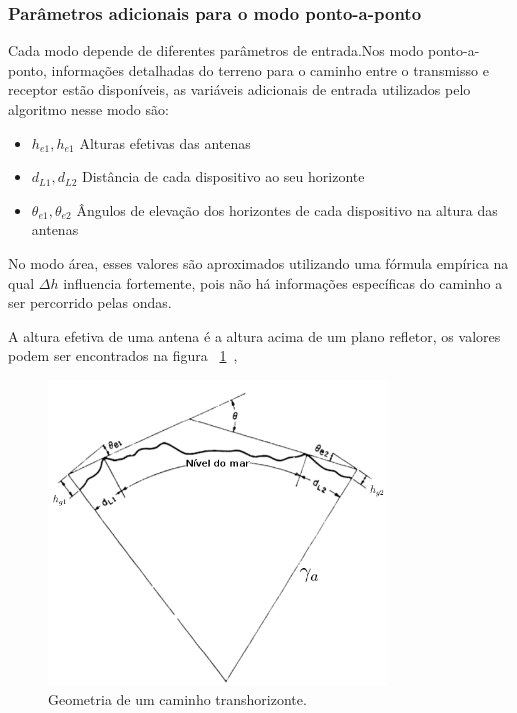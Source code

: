\subsubsection{Parâmetros adicionais para o modo ponto-a-ponto}

Cada modo depende de diferentes parâmetros de entrada.Nos modo ponto-a-ponto, informações detalhadas do terreno para o caminho entre o transmisso e receptor estão disponíveis, as variáveis adicionais de entrada utilizados pelo algoritmo nesse modo são:

\begin{itemize}
\item \begin{math}h_{e1}, h_{e1}\end{math} Alturas efetivas das antenas
\item \begin{math}d_{L1},d_{L2}\end{math} Distância de cada dispositivo ao seu horizonte
\item \begin{math}\theta_{e1}, \theta_{e2}\end{math} Ângulos de elevação dos horizontes de cada dispositivo na altura das antenas
\end{itemize}

No modo área, esses valores são aproximados utilizando uma fórmula empírica na qual $\Delta h$ influencia fortemente, pois não há informações específicas do caminho a ser percorrido pelas ondas.

A altura efetiva de uma antena é a altura acima de um plano refletor, os valores podem ser encontrados na figura ~\ref{fig:radiohorizon}~\cite{longleyrice}, 

\begin{figure}[radiohorizon]
\centering
\includegraphics[width=0.8\textwidth]{figs/radiohorizon}
\caption[Geometria de um caminho transhorizonte.]
{Geometria de um caminho transhorizonte.}
\label{fig:radiohorizon}
\end{figure}

